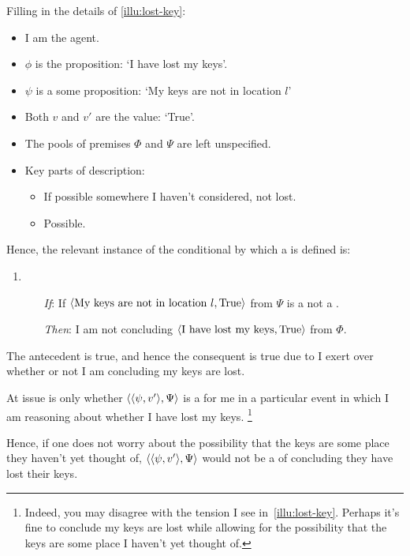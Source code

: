 \begin{note}
  Filling in the details of \autoref{illu:lost-key}:
  \begin{itemize}[noitemsep]
  \item
    I am the agent.
  \item
    \(\phi\) is the proposition: `I have lost my keys'.
  \item
    \(\psi\) is a some proposition: `My keys are not in location \(l\)'
  \item
    Both \(v\) and \(v'\) are the value: `True'.
  \item
    The pools of premises \(\Phi\) and \(\Psi\) are left unspecified.
  \item
    Key parts of description:
    \begin{itemize}
    \item
      If possible somewhere I haven't considered, not lost.
    \item
      Possible.
    \end{itemize}
  \end{itemize}

  Hence, the relevant instance of the conditional by which a \requ{} is defined is:

  \begin{enumerate}[label=]
  \item
    \begin{itemize}
    \item[\emph{If}:]
      If \(\langle \text{My keys are not in location }l, \text{True} \rangle\) from \(\Psi\) is a not a \fc{}.
    \item[\emph{Then}:]
      I am not concluding \(\langle \text{I have lost my keys}, \text{True} \rangle\) from \(\Phi\).
    \end{itemize}
  \end{enumerate}

  The antecedent is true, and hence the consequent is true due to \ninf{} I exert over whether or not I am concluding my keys are lost.
\end{note}

\begin{note}
  At issue is only whether \(\langle \langle \psi, v' \rangle, \Psi \rangle\) is a \requ{} for me in a particular event in which I am reasoning about whether I have lost my keys.%
  \footnote{
    Indeed, you may disagree with the tension I see in~\autoref{illu:lost-key}.
  Perhaps it's fine to conclude my keys are lost while allowing for the possibility that the keys are some place I haven't yet thought of.
  }

  Hence, if one does not worry about the possibility that the keys are some place they haven't yet thought of, \(\langle \langle \psi, v' \rangle, \Psi \rangle\) would not be a  of concluding they have lost their keys.
\end{note}

